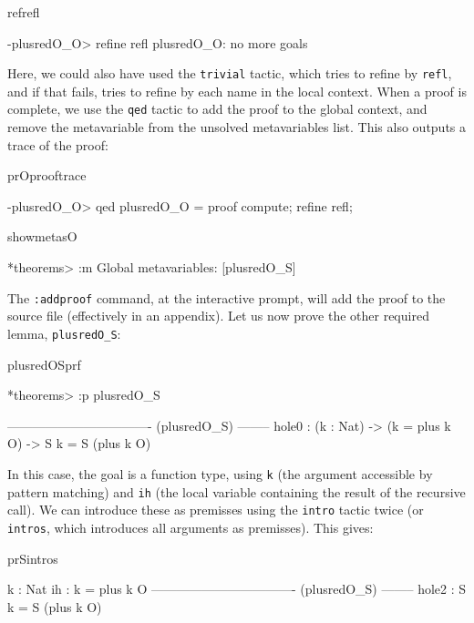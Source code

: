 \begin{SaveVerbatim}{refrefl}

-plusredO_O> refine refl 
plusredO_O: no more goals

\end{SaveVerbatim}

\noindent
Here, we could also have used the \texttt{trivial} tactic, which tries to refine by
\texttt{refl}, and if that fails, tries to refine by each name in the local context.
When a proof is complete, we use the \texttt{qed} tactic to add the proof to the
global context, and remove the metavariable from the unsolved metavariables list.
This also outputs a trace of the proof:

\begin{SaveVerbatim}{prOprooftrace}

-plusredO_O> qed 
plusredO_O = proof {
    compute;
    refine refl;
}

\end{SaveVerbatim}

\begin{SaveVerbatim}{showmetasO}

*theorems> :m 
Global metavariables:
        [plusredO_S]

\end{SaveVerbatim}

\noindent
The \texttt{:addproof} command, at the interactive prompt, will add the proof to
the source file (effectively in an appendix).
Let us now prove the other required lemma, \texttt{plusredO\_S}:

\begin{SaveVerbatim}{plusredOSprf}

*theorems> :p plusredO_S 

---------------------------------- (plusredO_S) --------
{hole0} : (k : Nat) -> (k = plus k O) -> S k = S (plus k O)

\end{SaveVerbatim}

\noindent
In this case, the goal is a function type, using \texttt{k} (the argument accessible by
pattern matching) and \texttt{ih} (the local variable containing the result of
the recursive call). We can introduce these as premisses using the \texttt{intro} tactic
twice (or \texttt{intros}, which introduces all arguments as premisses). This gives:

\begin{SaveVerbatim}{prSintros}

  k : Nat
  ih : k = plus k O
---------------------------------- (plusredO_S) --------
{hole2} : S k = S (plus k O)

\end{SaveVerbatim}


